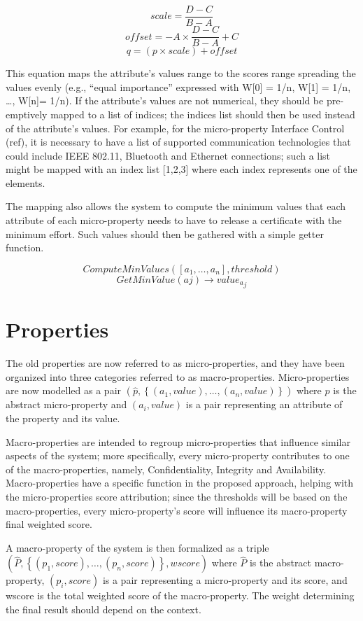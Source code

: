 \[ scale = \frac{D - C }{B - A} \]
\[offset = -A \times \frac{D - C}{B - A} + C\]
\[q = \left ( p \times scale \right ) + offset\]

This equation maps the attribute's values range to the scores range spreading the values evenly (e.g., “equal importance” expressed with W[0] = 1/n, W[1] = 1/n, …, W[n]= 1/n). If the attribute's values are not numerical, they should be pre-emptively mapped to a list of indices; the indices list should then be used instead of the attribute's values. For example, for the micro-property Interface Control (ref), it is necessary to have a list of supported communication technologies that could include IEEE 802.11, Bluetooth and Ethernet connections; such a list might be mapped with an index list [1,2,3] where each index represents one of the elements.

The mapping also allows the system to compute the minimum values that each attribute of each micro-property needs to have to release a certificate with the minimum effort. Such values should then be gathered with a simple getter function.

\[ComputeMinValues([a_1, \dots , a_n], threshold)\]
\[GetMinValue(aj) \rightarrow {value_a}_j\]

\section{Properties}
The old properties are now referred to as micro-properties, and they have been organized into three categories referred to as macro-properties. Micro-properties are now modelled as a pair \(\left (\hat{p}, \left \{  (a_1, value), \dots , (a_n, value)\right \} \right )\) 
where \(\hat{p}\) is the abstract micro-property and \(\left ( a_i ,value \right )\) is a pair representing an attribute of the property and its value.

Macro-properties are intended to regroup micro-properties that influence similar aspects of the system; more specifically, every micro-property contributes to one of the macro-properties, namely, Confidentiality, Integrity and Availability. Macro-properties have a specific function in the proposed approach, helping with the micro-properties score attribution; since the thresholds will be based on the macro-properties, every micro-property's score will influence its macro-property final weighted score.

A macro-property of the system is then formalized as a triple \\ \( \left ( \hat{P}, \left \{(p_1, score), \dots , (p_n, score )\right \}, wscore \right ) \)
where \(\hat{P}\) is the abstract macro-property, \( \left (p_i, score \right ) \) is a pair representing a micro-property and its score, and wscore is the total weighted score of the macro-property. The weight determining the final result should depend on the context. 




